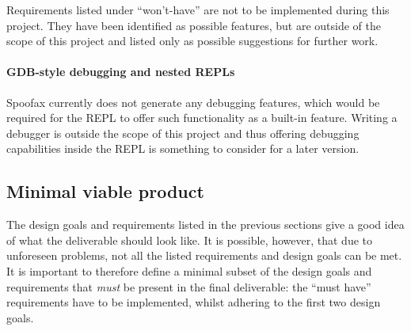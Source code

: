 Requirements listed under ``won't-have'' are not to be implemented during this
project. They have been identified as possible features, but are outside of the
scope of this project and listed only as possible suggestions for further work.

\paragraph{GDB-style debugging and nested REPLs} Spoofax currently does not
generate any debugging features, which would be required for the REPL to offer
such functionality as a built-in feature. Writing a debugger is outside
the scope of this project and thus offering debugging capabilities inside
the REPL is something to consider for a later version.

\subsection{Minimal viable product}
\label{ssec:mvp}

The design goals and requirements listed in the previous sections give a good
idea of what the deliverable should look like. It is possible, however, that due
to unforeseen problems, not all the listed requirements and design goals can be
met. It is important to therefore define a minimal subset of the design goals
and requirements that \emph{must} be present in the final deliverable: the
``must have'' requirements have to be implemented, whilst adhering to the first
two design goals.

